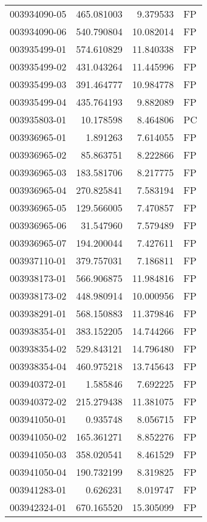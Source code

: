 \begin{tabular}{lrrl}
003934090-05 &  465.081003 &     9.379533 &   FP \\
003934090-06 &  540.790804 &    10.082014 &   FP \\
003935499-01 &  574.610829 &    11.840338 &   FP \\
003935499-02 &  431.043264 &    11.445996 &   FP \\
003935499-03 &  391.464777 &    10.984778 &   FP \\
003935499-04 &  435.764193 &     9.882089 &   FP \\
003935803-01 &   10.178598 &     8.464806 &   PC \\
003936965-01 &    1.891263 &     7.614055 &   FP \\
003936965-02 &   85.863751 &     8.222866 &   FP \\
003936965-03 &  183.581706 &     8.217775 &   FP \\
003936965-04 &  270.825841 &     7.583194 &   FP \\
003936965-05 &  129.566005 &     7.470857 &   FP \\
003936965-06 &   31.547960 &     7.579489 &   FP \\
003936965-07 &  194.200044 &     7.427611 &   FP \\
003937110-01 &  379.757031 &     7.186811 &   FP \\
003938173-01 &  566.906875 &    11.984816 &   FP \\
003938173-02 &  448.980914 &    10.000956 &   FP \\
003938291-01 &  568.150883 &    11.379846 &   FP \\
003938354-01 &  383.152205 &    14.744266 &   FP \\
003938354-02 &  529.843121 &    14.796480 &   FP \\
003938354-04 &  460.975218 &    13.745643 &   FP \\
003940372-01 &    1.585846 &     7.692225 &   FP \\
003940372-02 &  215.279438 &    11.381075 &   FP \\
003941050-01 &    0.935748 &     8.056715 &   FP \\
003941050-02 &  165.361271 &     8.852276 &   FP \\
003941050-03 &  358.020541 &     8.461529 &   FP \\
003941050-04 &  190.732199 &     8.319825 &   FP \\
003941283-01 &    0.626231 &     8.019747 &   FP \\
003942324-01 &  670.165520 &    15.305099 &   FP \\

\end{tabular}
